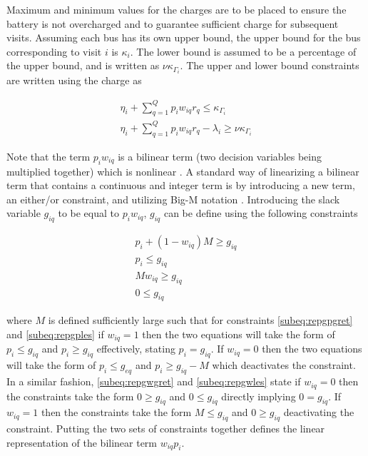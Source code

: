 \documentclass[letterpaper, 10pt, conference]{IEEEtran}
\begin{document}
Maximum and minimum values for the charges are to be placed to ensure the battery is not overcharged and to guarantee sufficient charge for subsequent visits. Assuming each bus has its own upper bound, the upper bound for the bus corresponding to visit $i$ is $\kappa_i$. The lower bound is assumed to be a percentage of the upper bound, and is written as $\nu \kappa_{\Gamma_i}$. The upper and lower bound constraints are written using the charge as

\begin{subequations}
\begin{align}
    \eta_i + \sum_{q=1}^Q p_i w_{iq} r_q \leq \kappa_{\Gamma_i}                 \\
    \eta_i + \sum_{q=1}^Q p_i w_{iq} r_q - \lambda_i \geq \nu \kappa_{\Gamma_i}
\end{align}
\end{subequations}

Note that the term $p_i w_{iq}$ is a bilinear term (two decision variables being multiplied together) which is nonlinear \cite{Rodriguez2013}. A standard way of linearizing a bilinear term that contains a continuous and integer term is by introducing a new term, an either/or constraint, and utilizing Big-M notation \cite{Chen2010,Rodriguez2013}. Introducing the slack variable $g_{iq}$ to be equal to $p_i w_{iq}$, $g_{iq}$ can be define using the following constraints

\begin{subequations}
\begin{align}
    p_i + (1 - w_{iq})M \geq g_{iq}  \label{subeq:repgpgret} \\
    p_i \leq g_{iq}                 \label{subeq:repgples} \\
    Mw_{iq} \geq g_{iq}              \label{subeq:repgwgret} \\
    0 \leq g_{iq}                   \label{subeq:repgwles}
\end{align}
\end{subequations}

\noindent
where $M$ is defined sufficiently large such that for constraints \eqref{subeq:repgpgret} and \eqref{subeq:repgples} if $w_{iq} = 1$ then the two equations will take the form of $p_i \leq g_{iq}$ and $p_i \geq g_{iq}$ effectively, stating $p_i = g_{iq}$. If $w_{iq} = 0$ then the two equations will take the form of $p_i \leq g_{eq}$ and $p_i \geq g_{iq} - M$ which deactivates the constraint. In a similar fashion, \eqref{subeq:repgwgret} and \eqref{subeq:repgwles} state if $w_{iq} = 0$ then the constraints take the form $0 \geq g_{iq}$ and $0 \leq g_{iq}$ directly implying $0 = g_{iq}$. If $w_{iq} = 1$ then the constraints take the form $M \leq g_{iq}$ and $0 \geq g_{iq}$ deactivating the constraint. Putting the two sets of constraints together defines the linear representation of the bilinear term $w_{iq} p_i$.
\end{document}

